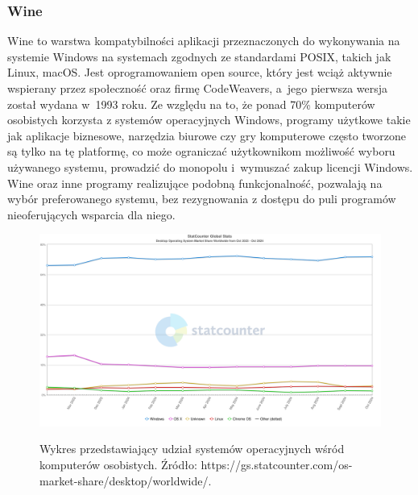 \subsubsection{Wine\cite{wine}}
Wine to warstwa kompatybilności aplikacji przeznaczonych do wykonywania na systemie Windows na systemach zgodnych ze standardami POSIX, takich jak Linux, macOS. Jest oprogramowaniem open source, który jest wciąż aktywnie wspierany przez społeczność oraz firmę CodeWeavers, a~jego pierwsza wersja został wydana w~1993 roku. Ze względu na to, że ponad 70\% komputerów osobistych korzysta z systemów operacyjnych Windows\cite{windowsMarketShare}, programy użytkowe takie jak aplikacje biznesowe, narzędzia biurowe czy gry komputerowe często tworzone są tylko na tę platformę, co może ograniczać użytkownikom możliwość wyboru używanego systemu, prowadzić do monopolu i~wymuszać zakup licencji Windows. Wine oraz inne programy realizujące podobną funkcjonalność, pozwalają na wybór preferowanego systemu, bez rezygnowania z dostępu do puli programów nieoferujących wsparcia dla niego.

\begin{figure}[!h]
	\begin{center}
		\resizebox{1\textwidth}{!} {
			\includegraphics{img/3/desktop-os-market-share.png}
		}
		\caption{Wykres przedstawiający udział systemów operacyjnych wśród komputerów osobistych. Źródło: https://gs.statcounter.com/os-market-share/desktop/worldwide/.}
		\label{desktop-os-market-share}
	\end{center}
\end{figure}

